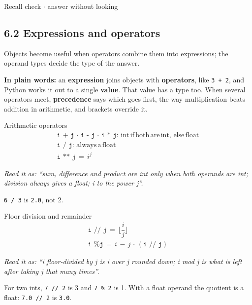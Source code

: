 \documentclass[11pt]{article}
\begin{document}
\begin{keepsection}
\begin{recallbox}{Recall check \ensuremath{\cdot} answer without looking}
\end{recallbox}
\end{keepsection}

\begin{keepsection}
\section{6.2 Expressions and operators}

Objects become useful when operators combine them into expressions; the operand types decide the type of the answer.

\begin{plainbox}\textbf{In plain words:} an \textbf{expression} joins objects with \textbf{operators}, like \texttt{3 + 2}, and Python works it out to a single \textbf{value}. That value has a type too. When several operators meet, \textbf{precedence} says which goes first, the way multiplication beats addition in arithmetic, and brackets override it.\end{plainbox}

\begin{equationcard}{Arithmetic operators}
\[ \begin{gathered} \texttt{i + j}\, \cdot \, \texttt{i - j}\, \cdot \, \texttt{i * j}:\, \text{int}\, \text{if}\, \text{both}\, \text{are}\, \text{int},\, \text{else}\, \text{float} \\ \texttt{i / j}:\, \text{always}\, \mathrm{a}\, \text{float} \\ \texttt{i ** j}\, =\, {i}^{{j}} \end{gathered} \]
{\small \emph{Read it as: “sum, difference and product are int only when both operands are int; division always gives a float; i to the power j”.}\par  \texttt{6 / 3} is \texttt{2.0}, not 2.}
\end{equationcard}

\begin{equationcard}{Floor division and remainder}
\[ \begin{gathered} \texttt{i // j}\, =\, ⌊\dfrac{{i}}{{j}}⌋ \\ \texttt{i \% j}\, =\, {i}\, -\, {j}\, \cdot \, (\texttt{i // j}) \end{gathered} \]
{\small \emph{Read it as: “i floor-divided by j is i over j rounded down; i mod j is what is left after taking j that many times”.}\par  For two ints, \texttt{7 // 2} is 3 and \texttt{7 \% 2} is 1. With a float operand the quotient is a float: \texttt{7.0 // 2} is \texttt{3.0}.}
\end{equationcard}


\end{keepsection}
\end{document}

